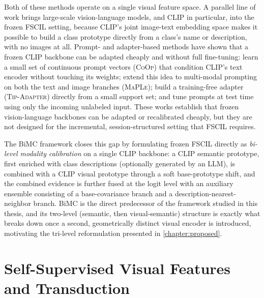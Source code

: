 \documentclass{iutbscthesis}
\begin{document}
Both of these methods operate on a single visual feature space. A parallel line of work brings large-scale vision-language models, and CLIP \autocite{radford2021learning} in particular, into the frozen FSCIL setting, because CLIP's joint image-text embedding space makes it possible to build a class prototype directly from a class's name or description, with no images at all. Prompt- and adapter-based methods have shown that a frozen CLIP backbone can be adapted cheaply and without full fine-tuning: \textcite{zhou2022coop} learn a small set of continuous prompt vectors (\textsc{CoOp}) that condition CLIP's text encoder without touching its weights; \textcite{khattak2023maple} extend this idea to multi-modal prompting on both the text and image branches (\textsc{MaPLe}); \textcite{zhang2022tipadapter} build a training-free adapter (\textsc{Tip-Adapter}) directly from a small support set; and \textcite{shu2022testtime} tune prompts at test time using only the incoming unlabeled input. These works establish that frozen vision-language backbones can be adapted or recalibrated cheaply, but they are not designed for the incremental, session-structured setting that FSCIL requires.

The BiMC framework \autocite{chen2025bimc} closes this gap by formulating frozen FSCIL directly as \emph{bi-level modality calibration} on a single CLIP backbone: a CLIP semantic prototype, first enriched with class descriptions (optionally generated by an LLM), is combined with a CLIP visual prototype through a soft base-prototype shift, and the combined evidence is further fused at the logit level with an auxiliary ensemble consisting of a base-covariance branch and a description-nearest-neighbor branch. BiMC is the direct predecessor of the framework studied in this thesis, and its two-level (semantic, then visual-semantic) structure is exactly what breaks down once a second, geometrically distinct visual encoder is introduced, motivating the tri-level reformulation presented in \autoref{chapter:proposed}.

\section{Self-Supervised Visual Features and Transduction}
\end{document}
